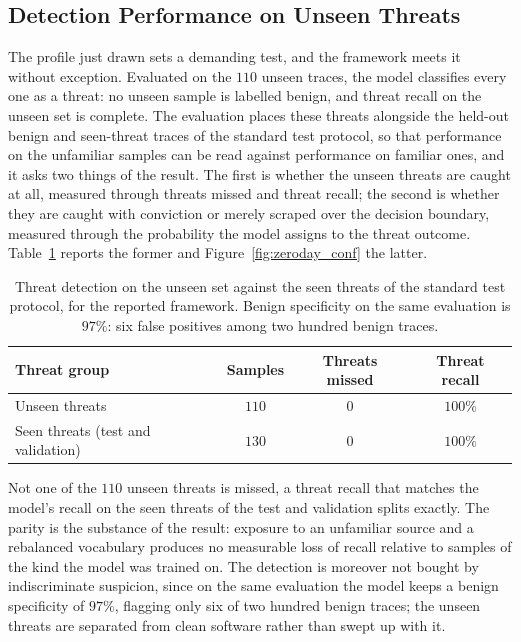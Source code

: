 \documentclass[%
    BCOR=10mm,
    DIV=13,
    toc=bibliography,
    toc=listof,
    oneside,
    12pt,
]{scrbook}
\begin{document}
\subsection{Detection Performance on Unseen Threats}
\label{subsec:zeroday_results}

The profile just drawn sets a demanding test, and the framework meets it without
exception. Evaluated on the $110$ unseen traces, the model classifies every one as
a threat: no unseen sample is labelled benign, and threat recall on the unseen set
is complete. The evaluation places these threats alongside the held-out benign and
seen-threat traces of the standard test protocol, so that performance on the
unfamiliar samples can be read against performance on familiar ones, and it asks
two things of the result. The first is whether the unseen threats are caught at
all, measured through threats missed and threat recall; the second is whether they
are caught with conviction or merely scraped over the decision boundary, measured
through the probability the model assigns to the threat outcome.
Table~\ref{tab:zeroday_detection} reports the former and
Figure~\ref{fig:zeroday_conf} the latter.

\begin{table}[H]
\centering
\small
\begin{tabular}{@{}lccc@{}}
\toprule
\textbf{Threat group} & \textbf{Samples} & \textbf{Threats missed} & \textbf{Threat recall} \\
\midrule
Unseen threats & $110$ & $0$ & $100\%$ \\
Seen threats (test and validation) & $130$ & $0$ & $100\%$ \\
\bottomrule
\end{tabular}
\caption[Detection on unseen versus seen threats]{Threat detection on the unseen set against the seen threats of the
standard test protocol, for the reported framework. Benign specificity on the same
evaluation is $97\%$: six false positives among two hundred benign traces.}
\label{tab:zeroday_detection}
\end{table}

Not one of the $110$ unseen threats is missed, a threat recall that matches the
model's recall on the seen threats of the test and validation splits exactly. The
parity is the substance of the result: exposure to an unfamiliar source and a
rebalanced vocabulary produces no measurable loss of recall relative to samples of
the kind the model was trained on. The detection is moreover not bought by
indiscriminate suspicion, since on the same evaluation the model keeps a benign
specificity of $97\%$, flagging only six of two hundred benign traces; the unseen
threats are separated from clean software rather than swept up with it.
\end{document}
